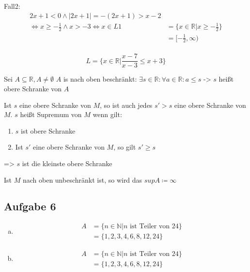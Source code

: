 \documentclass{article}
\begin{document}
Fall2:
\begin{align*}
  2x + 1 < 0 \land |2x  + 1| = -(2x + 1) > x - 2 \\
  \iff x \geq -\frac{1}{2} \land x > -3 \iff x \in L1 &= \{ x \in \mathbb{R} | x \geq -\frac{1}{2} \} \\
                                                      &= [-\frac{1}{2}, \infty) \\
\end{align*}


\[
  L = \{ x \in \mathbb{R} | \frac{x-7}{x-3} \leq x + 3 \}
\]

Sei $A \subseteq \mathbb{R}, A \ne \emptyset$ $A$ is nach oben beschränkt: $\exists s \in \mathbb{R} \colon \forall a \in \mathbb{R} \colon a \leq s$ -> $s$ heißt obere Schranke von $A$


Ist $s$ eine obere Schranke von $M$, so ist auch jedes $s' > s$ eine obere Schranke von $M$. $s$ heißt Supremum von
$M$ wenn gilt:
\begin{enumerate}
\item $s$ ist obere Schranke
\item Ist $s'$ eine obere Schranke von $M$, so gilt $s' \geq s$
\end{enumerate}

=> $s$ ist die kleinste obere Schranke

Ist $M$ nach oben unbeschränkt ist, so wird das  $sup A \coloneq \infty$

\subsection*{Aufgabe 6}
\begin{enumerate}[(a)]
\item
  \begin{align*}
    A &= \{ n \in \mathbb{N} | n \text{ ist Teiler von } 24\} \\
      &= \{ 1,2,3,4,6,8,12,24 \}
  \end{align*}
\item
\begin{align*}
    A &= \{ n \in \mathbb{N} | n \text{ ist Teiler von } 24\} \\
      &= \{ 1,2,3,4,6,8,12,24 \}
  \end{align*}  
\end{enumerate}
\end{document}
